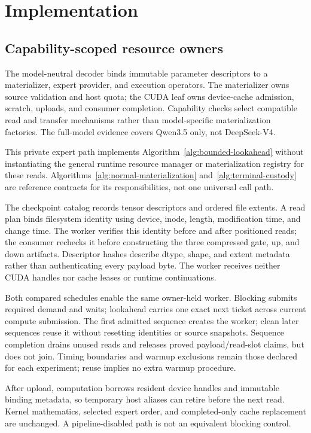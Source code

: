 \section{Implementation}
\label{sec:implementation}

\subsection{Capability-scoped resource owners}
\label{sec:implemented-read-path}
The model-neutral decoder binds immutable parameter descriptors to a
materializer, expert provider, and execution operators. The materializer owns
source validation and host quota; the CUDA leaf owns device-cache admission,
scratch, uploads, and consumer completion. Capability checks select compatible
read and transfer mechanisms rather than model-specific materialization
factories. The full-model evidence covers Qwen3.5 only, not DeepSeek-V4.

This private expert path implements Algorithm~\ref{alg:bounded-lookahead}
without instantiating the general runtime resource manager or materialization
registry for these reads. Algorithms~\ref{alg:normal-materialization}
and~\ref{alg:terminal-custody} are reference contracts for its responsibilities,
not one universal call path.

The checkpoint catalog records tensor descriptors and ordered file extents.
A read plan binds filesystem identity using device, inode, length, modification
time, and change time. The worker verifies this identity before and after
positioned reads; the consumer rechecks it before constructing the three
compressed gate, up, and down artifacts. Descriptor hashes describe dtype,
shape, and extent metadata rather than authenticating every payload byte.
The worker receives neither CUDA handles nor cache leases or runtime
continuations.

Both compared schedules enable the same owner-held worker. Blocking submits
required demand and waits; lookahead carries one exact next ticket across
current compute submission. The first admitted sequence creates the worker;
clean later sequences reuse it without resetting identities or source
snapshots. Sequence completion drains unused reads and releases proved
payload/read-slot claims, but does not join. Timing boundaries and warmup
exclusions remain those declared for each experiment; reuse implies no extra
warmup procedure.

After upload, computation borrows resident device handles and immutable
binding metadata, so temporary host aliases can retire before the next read.
Kernel mathematics, selected expert order, and completed-only cache
replacement are unchanged. A pipeline-disabled path is not an equivalent
blocking control.

